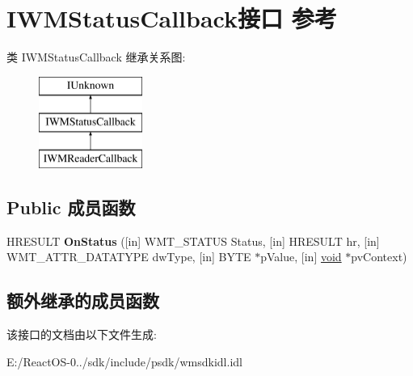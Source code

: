 \hypertarget{interface_i_w_m_status_callback}{}\section{I\+W\+M\+Status\+Callback接口 参考}
\label{interface_i_w_m_status_callback}
类 I\+W\+M\+Status\+Callback 继承关系图\+:\begin{figure}[H]
\begin{center}
\leavevmode
\includegraphics[height=3.000000cm]{interface_i_w_m_status_callback}
\end{center}
\end{figure}
\subsection*{Public 成员函数}
\begin{DoxyCompactItemize}
\item 
\mbox{\label{interface_i_w_m_status_callback_a65efea72a90f79888f821c4c806c277f}} 
H\+R\+E\+S\+U\+LT {\bfseries On\+Status} (\mbox{[}in\mbox{]} W\+M\+T\+\_\+\+S\+T\+A\+T\+US Status, \mbox{[}in\mbox{]} H\+R\+E\+S\+U\+LT hr, \mbox{[}in\mbox{]} W\+M\+T\+\_\+\+A\+T\+T\+R\+\_\+\+D\+A\+T\+A\+T\+Y\+PE dw\+Type, \mbox{[}in\mbox{]} B\+Y\+TE $\ast$p\+Value, \mbox{[}in\mbox{]} \hyperlink{interfacevoid}{void} $\ast$pv\+Context)
\end{DoxyCompactItemize}
\subsection*{额外继承的成员函数}


该接口的文档由以下文件生成\+:\begin{DoxyCompactItemize}
\item 
E\+:/\+React\+O\+S-\/0../sdk/include/psdk/wmsdkidl.\+idl\end{DoxyCompactItemize}
